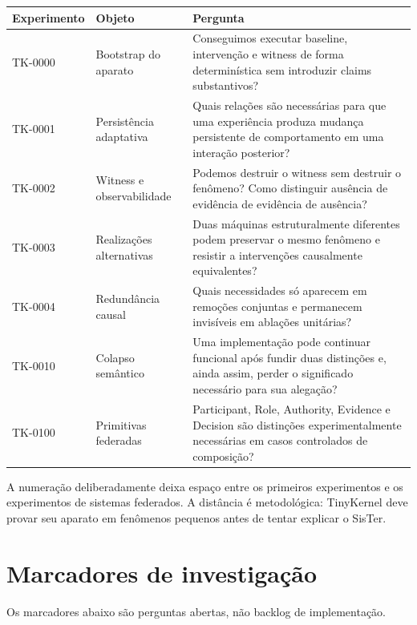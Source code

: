 \documentclass[11pt,a4paper]{article}
\begin{document}
\begin{longtable}{p{2.3cm}p{4.6cm}p{7.3cm}}
\toprule
Experimento & Objeto & Pergunta \\
\midrule
\endhead
TK-0000 &
Bootstrap do aparato &
Conseguimos executar baseline, intervenção e witness de forma determinística sem
introduzir claims substantivos? \\

TK-0001 &
Persistência adaptativa &
Quais relações são necessárias para que uma experiência produza mudança persistente
de comportamento em uma interação posterior? \\

TK-0002 &
Witness e observabilidade &
Podemos destruir o witness sem destruir o fenômeno? Como distinguir ausência de
evidência de evidência de ausência? \\

TK-0003 &
Realizações alternativas &
Duas máquinas estruturalmente diferentes podem preservar o mesmo fenômeno e resistir
a intervenções causalmente equivalentes? \\

TK-0004 &
Redundância causal &
Quais necessidades só aparecem em remoções conjuntas e permanecem invisíveis em
ablações unitárias? \\

TK-0010 &
Colapso semântico &
Uma implementação pode continuar funcional após fundir duas distinções e, ainda
assim, perder o significado necessário para sua alegação? \\

TK-0100 &
Primitivas federadas &
Participant, Role, Authority, Evidence e Decision são distinções experimentalmente
necessárias em casos controlados de composição? \\
\bottomrule
\end{longtable}

A numeração deliberadamente deixa espaço entre os primeiros experimentos e os
experimentos de sistemas federados. A distância é metodológica: TinyKernel deve
provar seu aparato em fenômenos pequenos antes de tentar explicar o SisTer.

\section{Marcadores de investigação}

Os marcadores abaixo são perguntas abertas, não backlog de implementação.
\end{document}
